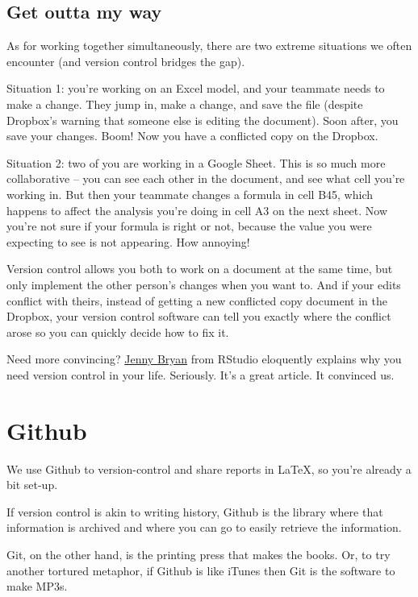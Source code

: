 \documentclass[
]{book}
\begin{document}
\hypertarget{get-outta-my-way}{%
\subsection{Get outta my way}\label{get-outta-my-way}}

As for working together simultaneously, there are two extreme situations we often encounter (and version control bridges the gap).

Situation 1: you're working on an Excel model, and your teammate needs to make a change. They jump in, make a change, and save the file (despite Dropbox's warning that someone else is editing the document). Soon after, you save your changes. Boom! Now you have a conflicted copy on the Dropbox.

Situation 2: two of you are working in a Google Sheet. This is so much more collaborative -- you can see each other in the document, and see what cell you're working in. But then your teammate changes a formula in cell B45, which happens to affect the analysis you're doing in cell A3 on the next sheet. Now you're not sure if your formula is right or not, because the value you were expecting to see is not appearing. How annoying!

Version control allows you both to work on a document at the same time, but only implement the other person's changes when you want to. And if your edits conflict with theirs, instead of getting a new conflicted copy document in the Dropbox, your version control software can tell you exactly where the conflict arose so you can quickly decide how to fix it.

Need more convincing? \href{https://peerj.com/preprints/3159v2/}{Jenny Bryan} from RStudio eloquently explains why you need version control in your life. Seriously. It's a great article. It convinced us.

\hypertarget{github}{%
\section{Github}\label{github}}

We use Github to version-control and share reports in LaTeX, so you're already a bit set-up.

If version control is akin to writing history, Github is the library where that information is archived and where you can go to easily retrieve the information.

Git, on the other hand, is the printing press that makes the books. Or, to try another tortured metaphor, if Github is like iTunes then Git is the software to make MP3s.
\end{document}
